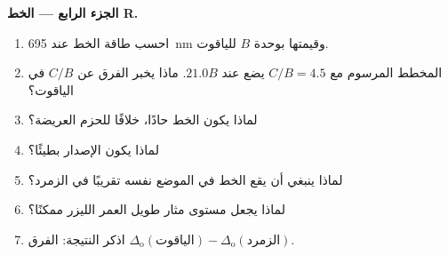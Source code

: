 \begin{problem}
\medskip\noindent\textbf{الجزء الرابع --- الخط R.}
\begin{enumerate}[resume]
  \item احسب طاقة الخط عند \qty{695}{nm} وقيمتها بوحدة $B$ للياقوت.
  \item المخطط المرسوم مع $C/B = 4.5$ يضع  عند $21.0B$. ماذا يخبر الفرق
        عن $C/B$ في الياقوت؟
  \item لماذا يكون الخط حادًا، خلافًا للحزم العريضة؟
  \item لماذا يكون الإصدار بطيئًا؟
  \item لماذا ينبغي أن يقع الخط في الموضع نفسه تقريبًا في الزمرد؟
  \item لماذا يجعل مستوى مثار طويل العمر الليزر ممكنًا؟
  \item اذكر النتيجة: الفرق $\Delta_{\mathrm o}(\text{الياقوت}) - \Delta_{\mathrm o}(\text{الزمرد})$.
\end{enumerate}
\end{problem}
